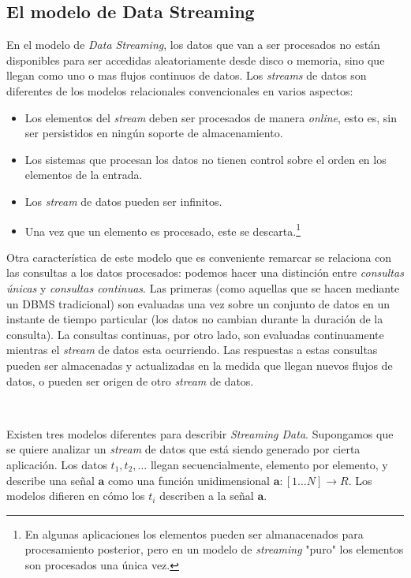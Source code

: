 \documentclass[a4paper,10pt, oneside]{article}
\begin{document}
\subsection{El modelo de Data Streaming}
En el modelo de \textit{Data Streaming}, los datos que van a ser procesados no están disponibles para ser accedidas aleatoriamente desde disco o memoria, sino que llegan como uno o mas flujos continuos de datos. Los \textit{streams} de datos son diferentes de los modelos relacionales convencionales en varios aspectos: 
\begin{itemize}
	\item Los elementos del \textit{stream} deben ser procesados de manera \textit{online}, esto es, sin ser persistidos en ningún soporte de almacenamiento.
	\item Los sistemas que procesan los datos no tienen control sobre el orden en los elementos de la entrada.
	\item Los \textit{stream} de datos pueden ser infinitos.
	\item Una vez que un elemento es procesado, este se descarta.\footnote{En algunas aplicaciones los elementos pueden ser almanacenados para procesamiento posterior, pero en un modelo de \textit{streaming} "puro" los elementos son procesados una única vez.}
\end{itemize}

Otra característica de este modelo que es conveniente remarcar se relaciona con las consultas a los datos procesados: podemos hacer una distinción entre \textit{consultas únicas} y \textit{consultas continuas}\cite{Terry:1992:CQO:141484.130333}. Las primeras (como aquellas que se hacen mediante un DBMS tradicional) son evaluadas una vez sobre un conjunto de datos en un instante de tiempo particular (los datos no cambian durante la duración de la consulta). La consultas continuas, por otro lado, son evaluadas continuamente mientras el \textit{stream} de datos esta ocurriendo. Las respuestas a estas consultas pueden ser almacenadas y actualizadas en la medida que llegan nuevos flujos de datos, o pueden ser origen de otro \textit{stream} de datos.

\

Existen tres modelos diferentes para describir \textit{Streaming Data}. Supongamos que se quiere analizar un \textit{stream} de datos que está siendo generado por cierta aplicación. Los datos $t_1, t_2, \dots$ llegan secuencialmente, elemento por elemento, y describe una señal $\mathbf{a}$ como una función unidimensional $\mathbf{a}: [1 \dots N] \rightarrow R$. Los modelos difieren en cómo los $t_i$ describen a la señal $\mathbf{a}$.
\end{document}
